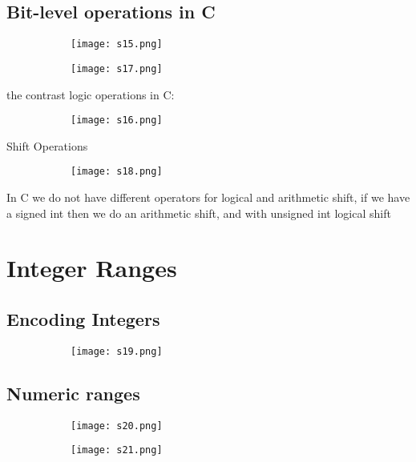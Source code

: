 \documentclass[8pt]{extreport}
\begin{document}
\subsection{Bit-level operations in C}
\begin{figure}[H]
\centering
\begin{subfigure}[b]{0.4\linewidth}
\texttt{[image: s15.png]}
\end{subfigure}
\begin{subfigure}[b]{0.4\linewidth}
\texttt{[image: s17.png]}
\end{subfigure}
\end{figure}
the contrast logic operations in C:
\begin{figure}[H]
\centering
\begin{subfigure}[b]{0.4\linewidth}
\texttt{[image: s16.png]}
\end{subfigure}
\end{figure}
Shift Operations
\begin{figure}[H]
\centering
\begin{subfigure}[b]{0.4\linewidth}
\texttt{[image: s18.png]}
\end{subfigure}
\end{figure}
In C we do not have different operators for logical and arithmetic shift, if we have a signed int then we do an arithmetic shift, and with unsigned int logical shift
\section{Integer Ranges}

\subsection{Encoding Integers}
\begin{figure}[H]
\centering
\begin{subfigure}[b]{0.4\linewidth}
\texttt{[image: s19.png]}
\end{subfigure}
\end{figure}
\subsection{Numeric ranges}
\begin{figure}[H]
\centering
\begin{subfigure}[b]{0.4\linewidth}
\texttt{[image: s20.png]}
\end{subfigure}
\begin{subfigure}[b]{0.4\linewidth}
\texttt{[image: s21.png]}
\end{subfigure}
\end{figure}
\end{document}
